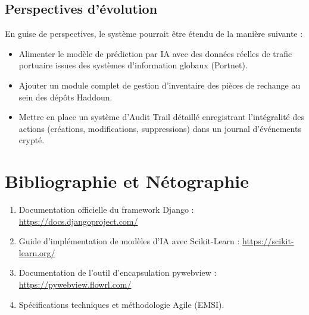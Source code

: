 \documentclass[12pt,a4paper,oneside]{report}
\begin{document}
\section*{Perspectives d'évolution}
En guise de perspectives, le système pourrait être étendu de la manière suivante :
\begin{itemize}
    \item Alimenter le modèle de prédiction par IA avec des données réelles de trafic portuaire issues des systèmes d'information globaux (Portnet).
    \item Ajouter un module complet de gestion d'inventaire des pièces de rechange au sein des dépôts Haddoun.
    \item Mettre en place un système d'Audit Trail détaillé enregistrant l'intégralité des actions (créations, modifications, suppressions) dans un journal d'événements crypté.
\end{itemize}

\chapter*{Bibliographie et Nétographie}

\begin{enumerate}
    \item Documentation officielle du framework Django : \url{https://docs.djangoproject.com/}
    \item Guide d'implémentation de modèles d'IA avec Scikit-Learn : \url{https://scikit-learn.org/}
    \item Documentation de l'outil d'encapsulation pywebview : \url{https://pywebview.flowrl.com/}
    \item Spécifications techniques et méthodologie Agile (EMSI).
\end{enumerate}
\end{document}
